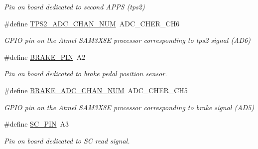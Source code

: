 \begin{DoxyCompactItemize}
\begin{DoxyCompactList}\small\item\em Pin on board dedicated to second A\+P\+PS (tps2) \end{DoxyCompactList}\item 
\mbox{\label{group___board__model__group_ga4cecb8c10512873904099a1a88d69ed3}} 
\#define \mbox{\hyperlink{group___board__model__group_ga4cecb8c10512873904099a1a88d69ed3}{T\+P\+S2\+\_\+\+A\+D\+C\+\_\+\+C\+H\+A\+N\+\_\+\+N\+UM}}~A\+D\+C\+\_\+\+C\+H\+E\+R\+\_\+\+C\+H6
\begin{DoxyCompactList}\small\item\em G\+P\+IO pin on the Atmel S\+A\+M3\+X8E processor corresponding to tps2 signal (A\+D6) \end{DoxyCompactList}\item 
\mbox{\label{group___board__model__group_gad632b56bf4c6259a390c3db91607078e}} 
\#define \mbox{\hyperlink{group___board__model__group_gad632b56bf4c6259a390c3db91607078e}{B\+R\+A\+K\+E\+\_\+\+P\+IN}}~A2
\begin{DoxyCompactList}\small\item\em Pin on board dedicated to brake pedal position sensor. \end{DoxyCompactList}\item 
\mbox{\label{group___board__model__group_ga310547321c4a016c4ad19922920fadfd}} 
\#define \mbox{\hyperlink{group___board__model__group_ga310547321c4a016c4ad19922920fadfd}{B\+R\+A\+K\+E\+\_\+\+A\+D\+C\+\_\+\+C\+H\+A\+N\+\_\+\+N\+UM}}~A\+D\+C\+\_\+\+C\+H\+E\+R\+\_\+\+C\+H5
\begin{DoxyCompactList}\small\item\em G\+P\+IO pin on the Atmel S\+A\+M3\+X8E processor corresponding to brake signal (A\+D5) \end{DoxyCompactList}\item 
\mbox{\label{group___board__model__group_gabbdb157ae4ad39d102935c21fa30d1c5}} 
\#define \mbox{\hyperlink{group___board__model__group_gabbdb157ae4ad39d102935c21fa30d1c5}{S\+C\+\_\+\+P\+IN}}~A3
\begin{DoxyCompactList}\small\item\em Pin on board dedicated to SC read signal. \end{DoxyCompactList}\item 

\end{DoxyCompactItemize}
